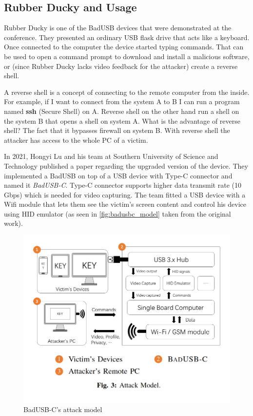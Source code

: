 \subsection*{Rubber Ducky and Usage}
\label{rubber_ducky}
Rubber Ducky is one of the BadUSB devices that were demonstrated at the conference. They presented an ordinary USB flask drive that acts like a keyboard. Once connected to the computer the device started typing commands. That can be used to open a command prompt to download and install a malicious software, or (since Rubber Ducky lacks video feedback for the attacker) create a reverse shell. 

A reverse shell is a concept of connecting to the remote computer from the inside. For example, if I want to connect from the system A to B I can run a program named \textbf{ssh} (Secure Shell) on A. Reverse shell on the other hand run a shell on the system B that opens a shell on system A. What is the advantage of reverse shell? The fact that it bypasses firewall on system B. With reverse shell the attacker has access to the whole PC of a victim. 

In 2021, Hongyi Lu and his team at Southern University of Science and Technology published a paper regarding the upgraded version of the device. They implemented a BadUSB on top of a USB device with Type-C connector and named it \emph{BadUSB-C}. Type-C connector supports higher data transmit rate (10 Gbps) which is needed for video capturing. The team fitted a USB device with a Wifi module that lets them see the victim's screen content and control his device using HID emulator (as seen in \autoref{fig:badusbc_model} taken from the original work)\cite{badusbc}.

\begin{figure}[ht]
    \centering
    \includegraphics[width=\linewidth]{obrazky-figures/badusbc_attack.png}
    \caption{BadUSB-C's attack model}
    \label{fig:badusbc_model}
\end{figure}

